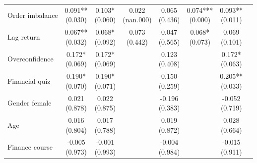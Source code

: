 \begin{threeparttable}
\begin{tabular}{lccccccc}
Order imbalance & \makecell{0.091** \\ (0.030) } & \makecell{0.103* \\ (0.060) } & \makecell{0.022 \\ (nan.000) } & \makecell{0.065 \\ (0.436) } & \makecell{0.074*** \\ (0.000) } & \makecell{0.093** \\ (0.011) } \\
Lag return & \makecell{0.067** \\ (0.032) } & \makecell{0.068* \\ (0.092) } & \makecell{0.073 \\ (0.442) } & \makecell{0.047 \\ (0.565) } & \makecell{0.068* \\ (0.073) } & \makecell{0.069 \\ (0.101) } \\
Overconfidence & \makecell{0.172* \\ (0.069) } & \makecell{0.172* \\ (0.069) } &  & \makecell{0.123 \\ (0.408) } &  & \makecell{0.172* \\ (0.063) } \\
Financial quiz & \makecell{0.190* \\ (0.070) } & \makecell{0.190* \\ (0.071) } &  & \makecell{0.150 \\ (0.259) } &  & \makecell{0.205** \\ (0.033) } \\
Gender female & \makecell{0.021 \\ (0.878) } & \makecell{0.022 \\ (0.875) } &  & \makecell{-0.196 \\ (0.383) } &  & \makecell{-0.052 \\ (0.719) } \\
Age & \makecell{0.016 \\ (0.804) } & \makecell{0.017 \\ (0.788) } &  & \makecell{0.019 \\ (0.872) } &  & \makecell{0.028 \\ (0.664) } \\
Finance course & \makecell{-0.005 \\ (0.973) } & \makecell{-0.001 \\ (0.993) } &  & \makecell{-0.004 \\ (0.984) } &  & \makecell{-0.015 \\ (0.911) } \\

\end{tabular}
\end{threeparttable}
